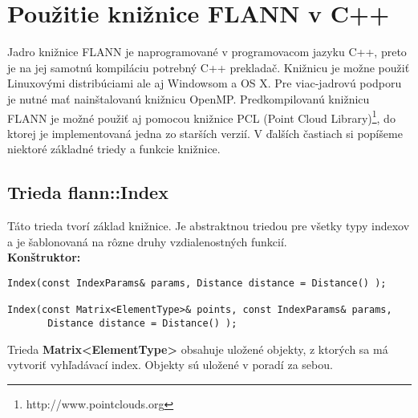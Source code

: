 \documentclass[12pt,oneside]{fithesis2}
\begin{document}
	\section{Použitie knižnice FLANN v C++}
	Jadro knižnice FLANN je naprogramované v programovacom jazyku C++, preto je na jej samotnú kompiláciu potrebný C++ prekladač. Knižnicu je možne použiť Linuxovými distribúciami ale aj Windowsom a OS X. Pre viac-jadrovú podporu je nutné mať nainštalovanú knižnicu OpenMP. Predkompilovanú knižnicu FLANN je  možné použiť aj pomocou knižnice PCL (Point Cloud Library)\footnote{http://www.pointclouds.org}, do ktorej je implementovaná jedna zo starších verzií. V ďalších častiach si popíšeme niektoré základné triedy a funkcie knižnice. 
	
	\subsection{Trieda flann::Index}  
	Táto trieda tvorí základ knižnice. Je abstraktnou triedou pre všetky typy indexov a je šablonovaná na rôzne druhy vzdialenostných funkcií. \\
\textbf{Konštruktor:}

{\scriptsize	
\begin{lstlisting}[frame=single]  
Index(const IndexParams& params, Distance distance = Distance() );

Index(const Matrix<ElementType>& points, const IndexParams& params,
       Distance distance = Distance() );
\end{lstlisting}}
Trieda \textbf{Matrix<ElementType>} obsahuje uložené objekty, z ktorých sa má vytvoriť vyhľadávací index. Objekty sú uložené v poradí za sebou. 
\end{document}
